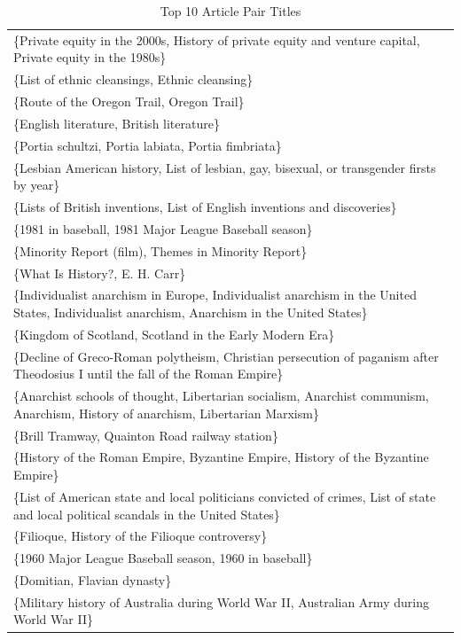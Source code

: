 \documentclass{acm_proc_article-sp}
\begin{document}
\begin{table}
\centering
\caption{Top 10 Article Pair Titles}
{\small
\begin{tabular}{| l |}
    \hline
\{Private equity in the 2000s, History of private equity and venture capital, Private equity in the 1980s\} \\
\{List of ethnic cleansings, Ethnic cleansing\} \\
\{Route of the Oregon Trail, Oregon Trail\} \\
\{English literature, British literature\} \\
\{Portia schultzi, Portia labiata, Portia fimbriata\} \\
\{Lesbian American history, List of lesbian, gay, bisexual, or transgender firsts by year\} \\
\{Lists of British inventions, List of English inventions and discoveries\} \\
\{1981 in baseball, 1981 Major League Baseball season\} \\
\{Minority Report (film), Themes in Minority Report\} \\
\{What Is History?, E. H. Carr\} \\
\{Individualist anarchism in Europe, Individualist anarchism in the United States, Individualist anarchism, Anarchism in the United States\} \\
\{Kingdom of Scotland, Scotland in the Early Modern Era\} \\
\{Decline of Greco-Roman polytheism, Christian persecution of paganism after Theodosius I until the fall of the Roman Empire\} \\
\{Anarchist schools of thought, Libertarian socialism, Anarchist communism, Anarchism, History of anarchism, Libertarian Marxism\} \\
\{Brill Tramway, Quainton Road railway station\} \\
\{History of the Roman Empire, Byzantine Empire, History of the Byzantine Empire\} \\
\{List of American state and local politicians convicted of crimes, List of state and local political scandals in the United States\} \\
\{Filioque, History of the Filioque controversy\} \\
\{1960 Major League Baseball season, 1960 in baseball\} \\
\{Domitian, Flavian dynasty\} \\
\{Military history of Australia during World War II, Australian Army during World War II\} \\

\end{tabular}}
\end{table}
\end{document}
